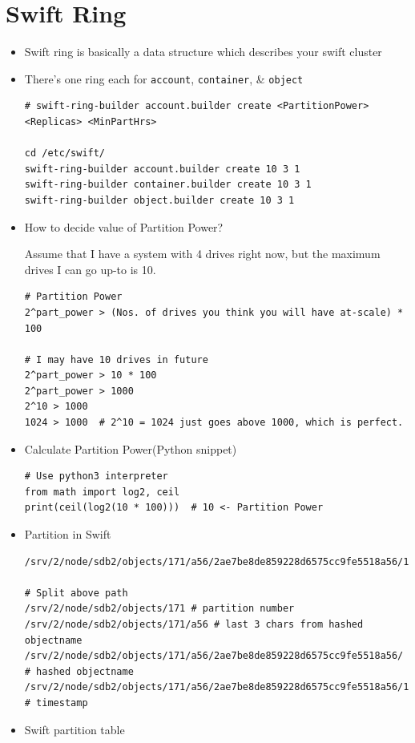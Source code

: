 \documentclass{article}
\begin{document}
\section{Swift Ring}
\label{sec:orgd00a86f}
\begin{itemize}
\item Swift ring is basically a data structure which describes your
swift cluster
\item There's one ring each for \texttt{account}, \texttt{container}, \& \texttt{object}
\begin{verbatim}
# swift-ring-builder account.builder create <PartitionPower> <Replicas> <MinPartHrs>

cd /etc/swift/
swift-ring-builder account.builder create 10 3 1
swift-ring-builder container.builder create 10 3 1
swift-ring-builder object.builder create 10 3 1
\end{verbatim}

\item How to decide value of Partition Power?

Assume that I have a system with 4 drives right now, but the
maximum drives I can go up-to is 10.
\begin{verbatim}
# Partition Power
2^part_power > (Nos. of drives you think you will have at-scale) * 100

# I may have 10 drives in future
2^part_power > 10 * 100
2^part_power > 1000
2^10 > 1000
1024 > 1000  # 2^10 = 1024 just goes above 1000, which is perfect.
\end{verbatim}

\item Calculate Partition Power(Python snippet)
\begin{verbatim}
# Use python3 interpreter
from math import log2, ceil
print(ceil(log2(10 * 100)))  # 10 <- Partition Power
\end{verbatim}

\item Partition in Swift

\begin{verbatim}
/srv/2/node/sdb2/objects/171/a56/2ae7be8de859228d6575cc9fe5518a56/1479968148.23926.data

# Split above path
/srv/2/node/sdb2/objects/171 # partition number
/srv/2/node/sdb2/objects/171/a56 # last 3 chars from hashed objectname
/srv/2/node/sdb2/objects/171/a56/2ae7be8de859228d6575cc9fe5518a56/ # hashed objectname
/srv/2/node/sdb2/objects/171/a56/2ae7be8de859228d6575cc9fe5518a56/1479968148 # timestamp
\end{verbatim}

\item Swift partition table
\end{itemize}
\end{document}
